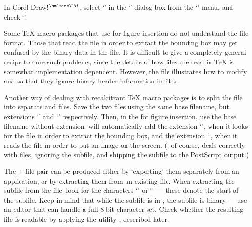 \bpar In Corel Draw!$^{\smlsize TM}$,
select `' in the `' dialog 
box from the `' menu, and check `'.

\endbullets



Some {\TeX} macro packages that use {\lavender\verb@\special@\revert} 
for figure insertion %
do not understand the {\EPSF} file format.
Those that read the file in order to extract the bounding box may get
confused by the binary data in the {\EPSF} file. 
%
It is difficult to give a completely general recipe to cure such problems,
since the details of how files are read in {\TeX} is somewhat
implementation dependent.  However, the file 
illustrates how to modify  and   
so that they ignore binary header information in {\EPSF} files.


Another way of dealing with recalcitrant {\TeX} macro packages is to split
the {\EPSF} file into separate {\TIFF} and {\EPS} files.  
Save the two files using the same base filename, but extensions
`' and `' respectively.  
Then, in the {\lavender\verb@\special@\revert} for figure insertion,
use the base filename without extension. 
{\DVIWindo} will automatically add the extension `', 
when it looks for the {\EPS} file in order to extract the  bounding box, 
and the extension `', when it reads the {\TIFF} file in order
to put an image on the screen.
%
({\DVIPSONE}, of course, deals correctly with {\EPSF} files, 
ignoring the {\TIFF} subfile, and shipping the {\EPS} subfile to the
PostScript output.)

The {\EPS} $+$ {\TIFF} file pair can be produced either by `exporting'
them separately from an application, or by extracting them from an
existing {\EPSF} file. 
When extracting the {\TIFF} subfile from the {\EPSF} file, look
for the characters `' or `' --- these denote the
start of the {\TIFF} subfile. 
Keep in mind that while the {\EPS} subfile is in {\ASCII}, 
the {\TIFF} subfile is binary --- use an editor that can handle a full
8-bit character set. 
Check whether the resulting {\TIFF} file is readable by applying the
utility {\TIFFTAGS}, described later.

